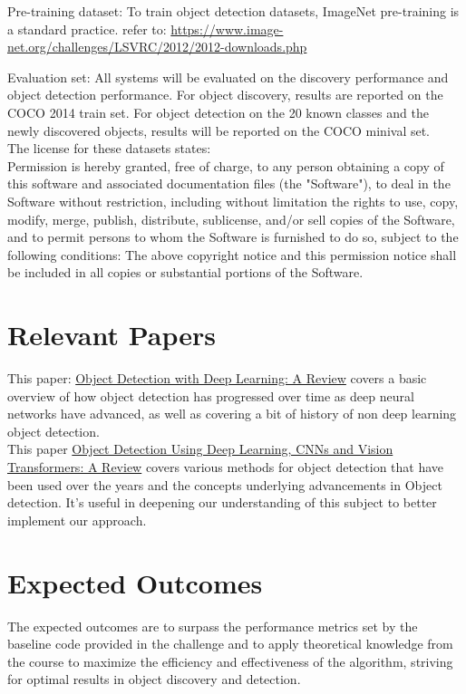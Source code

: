 \documentclass{article}
\begin{document}
	Pre-training dataset: To train object detection datasets, ImageNet pre-training is a standard practice. refer to: \url{https://www.image-net.org/challenges/LSVRC/2012/2012-downloads.php}
	
	Evaluation set: All systems will be evaluated on the discovery performance and object detection performance. For object discovery, results are reported on the COCO 2014 train set. For object detection on the 20 known classes and the newly discovered objects, results will be reported on the COCO minival set.\\
 
 The license for these datasets states: \\Permission is hereby granted, free of charge, to any person obtaining a copy
of this software and associated documentation files (the "Software"), to deal
in the Software without restriction, including without limitation the rights
to use, copy, modify, merge, publish, distribute, sublicense, and/or sell
copies of the Software, and to permit persons to whom the Software is
furnished to do so, subject to the following conditions: The above copyright notice and this permission notice shall be included in all
copies or substantial portions of the Software.
	
	\section{Relevant Papers}
 This paper: \href{https://arxiv.org/pdf/1807.05511.pdf}{Object Detection with Deep Learning: A Review} covers a basic overview of how object detection has progressed over time as deep neural networks have advanced, as well as covering a bit of history of non deep learning object detection.\\
 This paper \href{https://ieeexplore.ieee.org/document/10098596}{Object Detection Using Deep Learning, CNNs and Vision Transformers: A Review} covers various methods for object detection that have been used over the years and the concepts underlying advancements in Object detection. It's useful in deepening our understanding of this subject to better implement our approach.
	\section{Expected Outcomes}
	
	
	The expected outcomes are to surpass the performance metrics set by the baseline code provided in the challenge and to apply theoretical knowledge from the course to maximize the efficiency and effectiveness of the algorithm, striving for optimal results in object discovery and detection.
	
\end{document}
